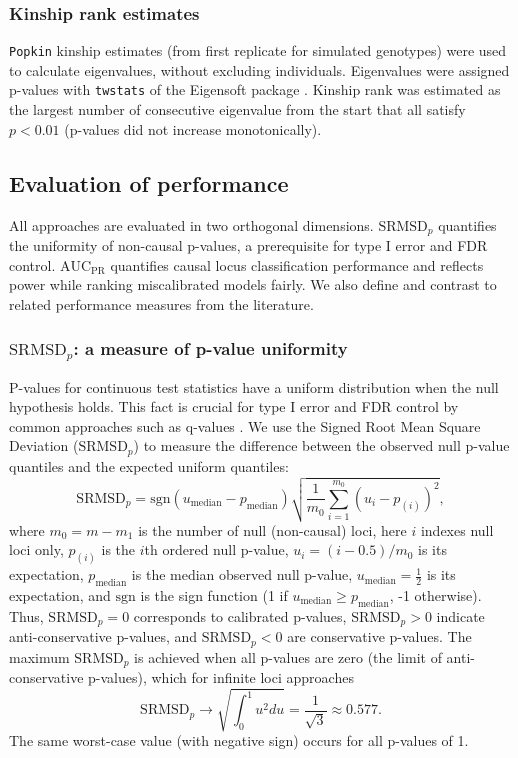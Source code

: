 \documentclass[11pt]{article}
\newcommand{\rmsd}{\text{SRMSD}_p}
\newcommand{\auc}{\text{AUC}_\text{PR}}
\begin{document}
\subsubsection{Kinship rank estimates}

\texttt{Popkin} kinship estimates (from first replicate for simulated genotypes) were used to calculate eigenvalues, without excluding individuals.
Eigenvalues were assigned p-values with \texttt{twstats} of the Eigensoft package \citep{patterson_population_2006}.
Kinship rank was estimated as the largest number of consecutive eigenvalue from the start that all satisfy $p < 0.01$ (p-values did not increase monotonically).

\subsection{Evaluation of performance}

All approaches are evaluated in two orthogonal dimensions.
$\rmsd$ quantifies the uniformity of non-causal p-values, a prerequisite for type I error and FDR control.
$\auc$ quantifies causal locus classification performance and reflects power while ranking miscalibrated models fairly.
We also define and contrast to related performance measures from the literature.

\subsubsection{$\rmsd$: a measure of p-value uniformity}

P-values for continuous test statistics have a uniform distribution when the null hypothesis holds.
This fact is crucial for type I error and FDR control by common approaches such as q-values \citep{storey_positive_2003, storey_statistical_2003}.
We use the Signed Root Mean Square Deviation ($\rmsd$) to measure the difference between the observed null p-value quantiles and the expected uniform quantiles:
$$
\rmsd
=
\text{sgn}(u_\text{median} - p_\text{median} ) \sqrt{ \frac{1}{m_0} \sum_{i = 1}^{m_0} \left( u_i - p_{(i)} \right)^2 },
$$
where
$m_0 = m - m_1$ is the number of null (non-causal) loci,
here $i$ indexes null loci only,
$p_{(i)}$ is the $i$th ordered null p-value,
$u_i = ( i - 0.5 ) / m_0$ is its expectation,
$p_\text{median}$ is the median observed null p-value,
$u_\text{median} = \frac{1}{2}$ is its expectation,
and $\text{sgn}$ is the sign function (1 if $u_\text{median} \ge p_\text{median}$, -1 otherwise).
Thus, $\rmsd = 0$ corresponds to calibrated p-values, $\rmsd > 0$ indicate anti-conservative p-values, and $\rmsd < 0$ are conservative p-values.
The maximum $\rmsd$ is achieved when all p-values are zero (the limit of anti-conservative p-values), which for infinite loci approaches
$$
\rmsd
\rightarrow
\sqrt{ \int_0^1 u^2 du }
=
\frac{1}{ \sqrt{ 3 } }
\approx
0.577
.
$$
The same worst-case value (with negative sign) occurs for all p-values of 1.
\end{document}
